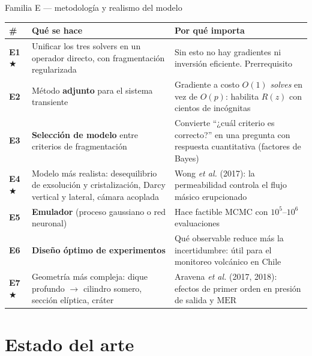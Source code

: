 \documentclass[aspectratio=169,10pt,t]{beamer}
\newcommand{\MER}{\mathrm{MER}}
\newcommand{\ideageo}{\textcolor{magma}{$\bigstar$}}
\begin{document}
\begin{frame}{Familia E — metodología y realismo del modelo}
\footnotesize
\begin{tabular}{@{}p{}p{}p{}@{}}
\toprule
\# & \textbf{Qué se hace} & \textbf{Por qué importa} \\
\midrule
\textbf{E1}\,\ideageo & Unificar los tres solvers en \alert{un} operador
directo, con fragmentación regularizada &
Sin esto no hay gradientes ni inversión eficiente. \alert{Prerrequisito} \\[0.3em]
\textbf{E2} & Método \textbf{adjunto} para el sistema transiente &
Gradiente a costo $O(1)$ \emph{solves} en vez de $O(p)$: habilita $R(z)$ con
cientos de incógnitas \\[0.3em]
\textbf{E3} & \textbf{Selección de modelo} entre criterios de fragmentación &
Convierte ``¿cuál criterio es correcto?'' en una pregunta con respuesta
cuantitativa (factores de Bayes) \\[0.3em]
\textbf{E4}\,\ideageo & Modelo más realista: desequilibrio de exsolución y
cristalización, Darcy vertical y lateral, cámara acoplada &
Wong \emph{et al.} (2017): la permeabilidad controla el flujo másico
erupcionado \\[0.3em]
\textbf{E5} & \textbf{Emulador} (proceso gaussiano o red neuronal) &
Hace factible MCMC con $10^5$–$10^6$ evaluaciones \\[0.3em]
\textbf{E6} & \textbf{Diseño óptimo de experimentos} &
Qué observable reduce más la incertidumbre: útil para el monitoreo
volcánico en Chile \\[0.3em]
\textbf{E7}\,\ideageo & Geometría más compleja: dique profundo $\to$ cilindro
somero, sección elíptica, cráter &
Aravena \emph{et al.} (2017, 2018): efectos de primer orden en presión de salida
y $\MER$ \\
\bottomrule
\end{tabular}
\end{frame}

\section{Estado del arte}
\end{document}

